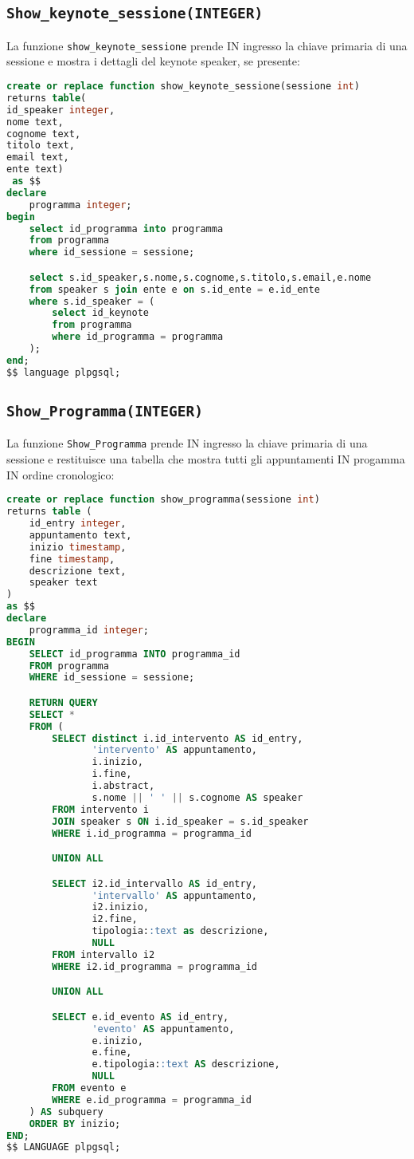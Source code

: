 \subsection{\texttt{Show\_keynote\_sessione(INTEGER)}}
La funzione \texttt{show\_keynote\_sessione} prende IN ingresso la chiave primaria di una sessione e mostra i dettagli del keynote speaker, se presente:
\begin{lstlisting}[language=SQL,style=mystyle]
create or replace function show_keynote_sessione(sessione int)
returns table(
id_speaker integer,
nome text,
cognome text,
titolo text,
email text,
ente text) 
 as $$
declare 
    programma integer;
begin
    select id_programma into programma
    from programma
    where id_sessione = sessione;

    select s.id_speaker,s.nome,s.cognome,s.titolo,s.email,e.nome
    from speaker s join ente e on s.id_ente = e.id_ente
    where s.id_speaker = (
        select id_keynote
        from programma
        where id_programma = programma
    );
end;
$$ language plpgsql;

\end{lstlisting}
\subsection{\texttt{Show\_Programma(INTEGER)}}
La funzione \texttt{Show\_Programma} prende IN ingresso la chiave primaria di una sessione e restituisce una tabella che mostra tutti gli appuntamenti IN progamma IN ordine cronologico:
\begin{lstlisting}[language=SQL,style=mystyle]
create or replace function show_programma(sessione int)
returns table (
    id_entry integer,
    appuntamento text,
    inizio timestamp,
    fine timestamp,
    descrizione text,
    speaker text
)
as $$
declare
    programma_id integer;
BEGIN
    SELECT id_programma INTO programma_id
    FROM programma
    WHERE id_sessione = sessione;

    RETURN QUERY
    SELECT *
    FROM (
        SELECT distinct i.id_intervento AS id_entry,
               'intervento' AS appuntamento,
               i.inizio,
               i.fine,
               i.abstract,
               s.nome || ' ' || s.cognome AS speaker
        FROM intervento i
        JOIN speaker s ON i.id_speaker = s.id_speaker
        WHERE i.id_programma = programma_id

        UNION ALL

        SELECT i2.id_intervallo AS id_entry,
               'intervallo' AS appuntamento,
               i2.inizio,
               i2.fine,
               tipologia::text as descrizione,
               NULL
        FROM intervallo i2
        WHERE i2.id_programma = programma_id

        UNION ALL

        SELECT e.id_evento AS id_entry,
               'evento' AS appuntamento,
               e.inizio,
               e.fine,
               e.tipologia::text AS descrizione,
               NULL
        FROM evento e
        WHERE e.id_programma = programma_id
    ) AS subquery
    ORDER BY inizio;
END;
$$ LANGUAGE plpgsql;
\end{lstlisting}
